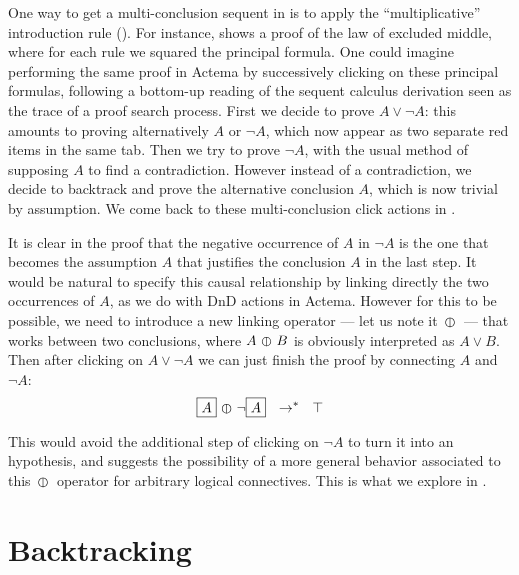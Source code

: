 One way to get a multi-conclusion sequent in  is to apply the
``multiplicative'' introduction rule {} (). For
instance,  shows a proof of the law of excluded middle, where for
each rule we squared the principal formula.
One could imagine performing the same proof in Actema by successively clicking
on these principal formulas, following a bottom-up reading of the sequent
calculus derivation seen as the trace of a proof search process. First we decide
to prove $A \lor \neg A$: this amounts to proving alternatively $A$ or $\neg
A$, which now appear as two separate red items in the same tab. Then we try to
prove $\neg A$, with the usual method of supposing $A$ to find a contradiction.
However instead of a contradiction, we decide to backtrack and prove the
alternative conclusion $A$, which is now trivial by assumption. We come back to
these multi-conclusion click actions in .

It is clear in the proof that the negative occurrence of $A$ in $\neg A$ is the
one that becomes the assumption $A$ that justifies the conclusion $A$ in the
last step. It would be natural to specify this causal relationship by linking
directly the two occurrences of $A$, as we do with DnD actions in Actema.
However for this to be possible, we need to introduce a new linking operator ---
let us note it $\operatorname{\,\varobar\,}$ --- that works between two conclusions, where $A \operatorname{\,\varobar\,} B$
is obviously interpreted as $A \lor B$. Then after clicking on $A \lor \neg A$
we can just finish the proof by connecting $A$ and $\neg A$:
$$\fbox{$A$} \operatorname{\,\varobar\,} \neg \fbox{$A$} ~~\rightarrow^\ast~~ \top$$

This would avoid the additional step of clicking on $\neg A$ to turn it into an
hypothesis, and suggests the possibility of a more general behavior
associated to this $\operatorname{\,\varobar\,}$ operator for arbitrary logical connectives. This is
what we explore in .

\section{Backtracking}



